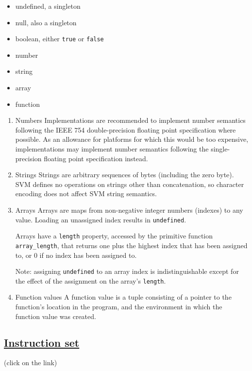 \documentclass[11pt]{article}
\begin{document}
\begin{itemize}
\item undefined, a singleton
\item null, also a singleton
\item boolean, either \texttt{true} or \texttt{false}
\item number
\item string
\item array
\item function
\end{itemize}

\begin{enumerate}
\item Numbers
\label{sec:org7d29292}
Implementations are recommended to implement number semantics following
the IEEE 754 double-precision floating point specification where
possible. As an allowance for platforms for which this would be too
expensive, implementations may implement number semantics following the
single-precision floating point specification instead.

\item Strings
\label{sec:org91f31a5}
Strings are arbitrary sequences of bytes (including the zero byte). SVM
defines no operations on strings other than concatenation, so character
encoding does not affect SVM string semantics.

\item Arrays
\label{sec:orgd568c88}
Arrays are maps from non-negative integer numbers (indexes) to any
value. Loading an unassigned index results in \texttt{undefined}.

Arrays have a \texttt{length} property, accessed by the primitive function
\texttt{array\_length}, that returns one plus the highest index that has been
assigned to, or 0 if no index has been assigned to.

Note: assigning \texttt{undefined} to an array index is indistinguishable
except for the effect of the assignment on the array's \texttt{length}.

\item Function values
\label{sec:orgd197755}
A function value is a tuple consisting of a pointer to the function's
location in the program, and the environment in which the function value
was created.
\end{enumerate}

\subsection{\href{SVML-Instruction-Set}{Instruction set}}
\label{sec:org5170515}
(click on the link)
\end{document}
